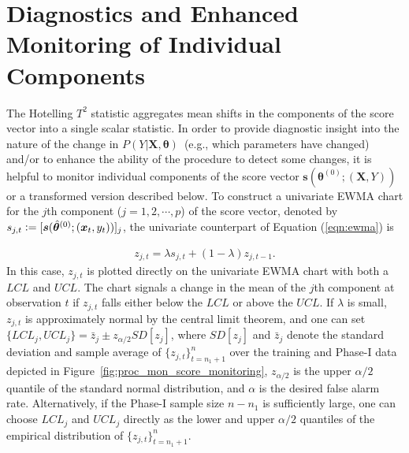 \documentclass[twoside,11pt]{article}
\begin{document}
\section{Diagnostics and Enhanced Monitoring of Individual Components}
\label{s:decou_cd}
The Hotelling $T^2$ statistic aggregates mean shifts in the components of the score vector into a single scalar statistic. In order to provide diagnostic insight into the nature of the change in $P(Y| \bm {X}, \bm{\theta})$~(e.g., which parameters have changed) and/or to enhance the ability of the procedure to detect some changes, it is helpful to monitor individual components of the score vector $\bm{s}(\bm { \theta}^{ (0)}; (\bm {X}, Y))$ or a transformed version described below. To construct a univariate EWMA chart for the $j$th component ($j=1,2,\cdots,p$) of the score vector, denoted by $s_{j,t} \vcentcolon= [\bm{s}(\hat{\bm { \theta}}^{(0)};(\bm {x}_t, y_t))]_j$, the univariate counterpart of Equation (\ref{eqn:ewma}) is

\begin{align}
z_{j,t} = \lambda s_{j,t} + (1 - \lambda) z_{j,t-1}.
\label{eqn:uniewma}
\end{align}
In this case, $z_{j,t}$ is plotted directly on the univariate EWMA chart with both a $LCL$ and $UCL$. The chart signals a change in the mean of the $j$th component at observation $t$ if $z_{j,t}$ falls either below the $LCL$ or above the $UCL$. If $\lambda$ is small, $z_{j,t}$ is approximately normal by the central limit theorem, and one can set  $\{LCL_j,UCL_j\} = \bar{z}_j \pm z_{\alpha/2}SD[z_j]$, where $SD[z_j]$ and $\bar{z}_j$ denote the standard deviation and sample average of $\{z_{j,t}\}_{t=n_1+1}^n$ over the training and Phase-I data depicted in Figure~\ref{fig:proc_mon_score_monitoring}, $z_{\alpha/2}$ is the upper $\alpha/2$ quantile of the standard normal distribution, and $\alpha$ is the desired false alarm rate. Alternatively, if the Phase-I sample size $n-n_1$ is sufficiently large, one can choose $LCL_j$ and $UCL_j$ directly as the lower and upper $\alpha/2$ quantiles of the empirical distribution of $\{z_{j,t}\}_{t=n_1+1}^n$. 
\end{document}
